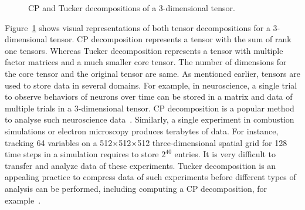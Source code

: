 \documentclass[a4paper,11pt]{article}
\begin{document}
\begin{figure}[htb]
\begin{center}
{}
			\caption{CP and Tucker decompositions of a 3-dimensional tensor.\label{fig:CTdecompositions}}
		\end{center}		
	\end{figure}
	
	
	
	
	Figure~\ref{fig:CTdecompositions} shows visual representations of both tensor decompositions for a 3-dimensional tensor. CP decomposition represents a tensor with the sum of rank one tensors. Whereas Tucker decomposition represents a tensor with multiple factor matrices and a much smaller core tensor. The number of dimensions for the core tensor and the original tensor are same. As mentioned earlier, tensors are used to store data in several domains. For example, in neuroscience, a single trial to observe behaviors of neurons over time can be stored in a matrix and data of multiple trials in a 3-dimensional tensor. CP decomposition is a popular method to analyse such neuroscience data~\cite{HKD-SIAM-2020}. Similarly, a single experiment in combustion simulations or electron microscopy produces terabytes of data. For instance, tracking 64 variables on a 512$\times$512$\times$512 three-dimensional spatial grid for 128 time steps in a simulation requires to store $2^{40}$ entries. It is very difficult to transfer and analyze data of these experiments. Tucker decomposition is an appealing practice to compress data of such experiments before different types of analysis can be performed, including computing a CP decomposition, for example~\cite{ABK-IPDPS-2016,BKK-TOMS-2020,RC-CILS-1998}.
	
\end{document}
